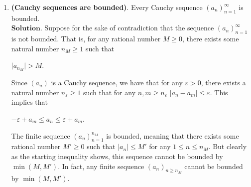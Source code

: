 \documentclass{article}
\theoremstyle{remark}
\begin{document}
    \begin{enumerate}
        \item \textbf{(Cauchy sequences are bounded)}. Every Cauchy sequence $(a_n)_{n=1}^{\infty}$
        is bounded.\\
        $\textbf{Solution.}$ Suppose for the sake of contradiction that the sequence $(a_n)_{n=1}^{\infty}$
        is not bounded.
        That is, for any rational number $M\geq 0$, there exists some natural number $n_M \geq 1$ such that
        \begin{center}
            $\displaystyle \vert a_{n_M} \vert > M$.
        \end{center}
        Since $(a_n)$ is a Cauchy sequence, we have that for any $\varepsilon > 0$,
        there exists a natural number $n_{\varepsilon} \geq 1$ such that for any $n,m \geq n_{\varepsilon}$
        $\left\lvert a_n - a_m \right\rvert \leq \varepsilon$.
        This implies that 
        \begin{center}
            $-\varepsilon+a_m \leq a_n \leq \varepsilon + a_m$.\\
        \end{center}        
        The finite sequence $(a_n)_{n=1}^{n_M}$ is bounded, meaning that 
        there exists some rational number $M' \geq 0$ such that $\vert a_n \vert \leq M'$
        for any $1\leq n \leq n_M$. But clearly as the starting inequality shows, this sequence
        cannot be bounded by $\min (M, M')$. In fact, any finite sequence $(a_n)_{n\geq n_M}$ 
        cannot be bounded by $\min (M, M')$.


\end{enumerate}
\end{document}
